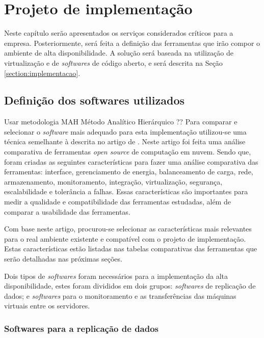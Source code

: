 \chapter{Projeto de implementação}
\label{cap:projetoimplementacao}

Neste capítulo serão apresentados os serviços considerados críticos para a empresa. Posteriormente, será feita a definição das ferramentas que
irão compor o ambiente de alta disponibilidade. A solução será baseada na utilização de virtualização e de \textit{softwares} de código aberto,
e será descrita na Seção \ref{section:implementacao}.

\section{Definição dos softwares utilizados}
\label{section:propostasolucao}

Usar metodologia MAH Método Analítico Hierárquico \cite{geordano2014} ??
Para comparar e selecionar o \textit{software} mais adequado para esta implementação utilizou-se uma técnica semelhante à descrita no artigo 
de \cite{thome2013}. Neste artigo foi feita uma análise comparativa de ferramentas \textit{open source} de computação em nuvem. Sendo que, 
foram criadas as seguintes características para fazer uma análise comparativa das ferramentas:
interface, gerenciamento de energia, balanceamento de carga, rede, armazenamento, monitoramento, integração, virtualização, segurança, 
escalabilidade e tolerância a falhas. Essas características são importantes para medir a qualidade e compatibilidade das ferramentas estudadas, 
além de comparar a usabilidade das ferramentas.

Com base neste artigo, procurou-se selecionar as características mais relevantes para o real ambiente existente e compatível com o projeto 
de implementação. Estas características estão listadas nas tabelas comparativas das ferramentas que serão detalhadas nas próximas seções.

Dois tipos de \textit{softwares} foram necessários para a implementação da alta disponibilidade, estes foram divididos em dois grupos: 
\textit{softwares} de replicação de dados; e \textit{softwares} para o monitoramento e as transferências das máquinas virtuais entre os servidores.

\subsection{Softwares para a replicação de dados}
\label{section:toolrepl}

